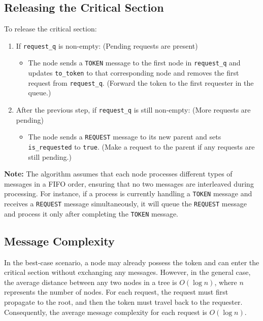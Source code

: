 \subsection{Releasing the Critical Section} \label{release}
To release the critical section:
\begin{enumerate}
    \item If \texttt{request\_q} is non-empty: (Pending requests are present)
        \begin{itemize}
            \item The node sends a \texttt{TOKEN} message to the first node in \texttt{request\_q} and updates \texttt{to\_token} to that corresponding node and removes the first request from \texttt{request\_q}. (Forward the token to the first requester in the queue.)
        \end{itemize}
    \item After the previous step, if \texttt{request\_q} is still non-empty: (More requests are pending)
        \begin{itemize}
            \item The node sends a \texttt{REQUEST} message to its new parent and sets \texttt{is\_requested} to \texttt{true}. (Make a request to the parent if any requests are still pending.)
        \end{itemize}
\end{enumerate}


\noindent \textbf{Note:} The algorithm assumes that each node processes different types of messages in a FIFO order, ensuring that no two messages are interleaved during processing. For instance, if a process is currently handling a \texttt{TOKEN} message and receives a \texttt{REQUEST} message simultaneously, it will queue the \texttt{REQUEST} message and process it only after completing the \texttt{TOKEN} message.

\subsection{Message Complexity}
In the best-case scenario, a node may already possess the token and can enter the critical section without exchanging any messages. However, in the general case, the average distance between any two nodes in a tree is \(O(\log n)\), where \(n\) represents the number of nodes. For each request, the request must first propagate to the root, and then the token must travel back to the requester. Consequently, the average message complexity for each request is \(O(\log n)\).